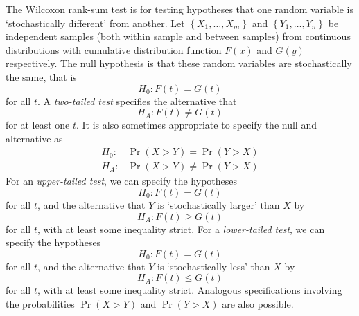 \documentclass[11pt]{report} %
\begin{document}
The Wilcoxon rank-sum test is for testing hypotheses that one random variable is `stochastically different' from another. Let $\left\{X_{1}, \dots, X_{m}\right\}$ and $\left\{Y_{1}, \dots, Y_{n}\right\}$ be independent samples (both within sample and between samples) from continuous distributions with cumulative distribution function $F\left(x\right)$ and $G\left(y\right)$ respectively. The null hypothesis is that these random variables are stochastically the same, that is
\begin{equation}
H_{0}: F\left(t\right) = G\left(t\right)
\end{equation}
for all $t$. A \textit{two-tailed test} specifies the alternative that
\begin{equation}
H_{A}: F\left(t\right) \neq G\left(t\right)
\end{equation}
for at least one $t$. It is also sometimes appropriate to specify the null and alternative as
\begin{align}
H_{0}: & \operatorname{Pr}\left(X > Y\right) = \operatorname{Pr}\left(Y > X\right) \\
H_{A}: & \operatorname{Pr}\left(X > Y\right) \neq \operatorname{Pr}\left(Y > X\right)
\end{align}
For an \textit{upper-tailed test}, we can specify the hypotheses
\begin{equation}
H_{0}: F\left(t\right) = G\left(t\right)
\end{equation}
for all $t$, and the alternative that $Y$ is `stochastically larger' than $X$ by
\begin{equation}
H_{A}: F\left(t\right) \geq G\left(t\right)
\end{equation}
for all $t$, with at least some inequality strict. For a \textit{lower-tailed test}, we can specify the hypotheses
\begin{equation}
H_{0}: F\left(t\right) = G\left(t\right)
\end{equation}
for all $t$, and the alternative that $Y$ is `stochastically less' than $X$ by
\begin{equation}
H_{A}: F\left(t\right) \leq G\left(t\right)
\end{equation}
for all $t$, with at least some inequality strict. Analogous specifications involving the probabilities $\operatorname{Pr}\left(X > Y\right)$ and $\operatorname{Pr}\left(Y > X\right)$ are also possible. \\
\end{document}
